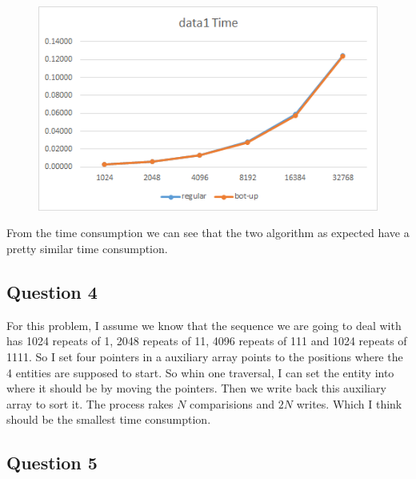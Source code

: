 \documentclass[conference]{IEEEtran}
\begin{document}
\begin{figure}[H]
    \centerline{\includegraphics[scale=0.65]{Pic/pic9.png}}
\end{figure}

From the time consumption we can see that the two algorithm as expected have a pretty 
similar time consumption.

\subsection*{Question 4}
For this problem, I assume we know that the sequence we are going to deal with has 
1024 repeats of 1, 2048 repeats of 11, 4096 repeats of 111 and 1024 repeats of 1111.
So I set four pointers in a auxiliary array points to the positions where the 4 entities 
are supposed to start. So whin one traversal, I can set the entity into where it 
should be by moving the pointers. Then we write back this auxiliary array to sort it.
The process rakes $N$ comparisions and $2N$ writes. Which I think should be the smallest
time consumption.

\subsection*{Question 5}
\end{document}
